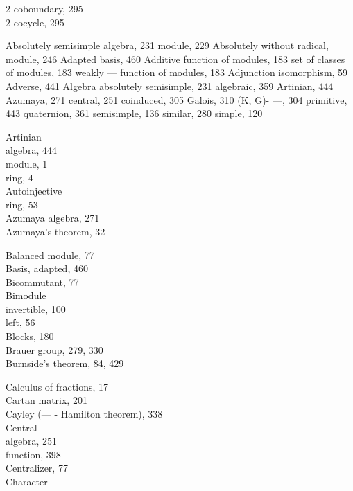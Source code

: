 
2-coboundary, 295\\
2-cocycle, 295


Absolutely semisimple algebra, 231 module, 229 Absolutely without radical, module, 246 Adapted basis, 460 Additive function of modules, 183 set of classes of modules, 183 weakly --- function of modules, 183 Adjunction isomorphism, 59 Adverse, 441 Algebra absolutely semisimple, 231 algebraic, 359 Artinian, 444 Azumaya, 271 central, 251 coinduced, 305 Galois, 310 (K, G)- ---, 304 primitive, 443 quaternion, 361 semisimple, 136 similar, 280 simple, 120

Artinian\\
algebra, 444\\
module, 1\\
ring, 4\\
Autoinjective\\
ring, 53\\
Azumaya algebra, 271\\
Azumaya's theorem, 32


Balanced module, 77\\
Basis, adapted, 460\\
Bicommutant, 77\\
Bimodule\\
invertible, 100\\
left, 56\\
Blocks, 180\\
Brauer group, 279, 330\\
Burnside's theorem, 84, 429


Calculus of fractions, 17\\
Cartan matrix, 201\\
Cayley (--- - Hamilton theorem), 338\\
Central\\
algebra, 251\\
function, 398\\
Centralizer, 77\\
Character

